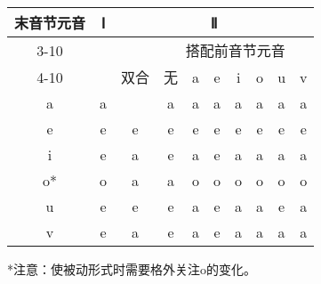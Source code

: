 \begin{center}
    \begin{tabular}{c|c|c|c|c|c|c|c|c|c}
        \toprule
        \multirow{4}{*}{末音节元音} & \multirow{4}{*}{Ⅰ} & \multicolumn{8}{c}{Ⅱ} \\
        \cline{3-10} 
        & & \multirow{3}{*}{双合} & \multicolumn{7}{c}{搭配前音节元音} \\ 
        \cline{4-10} 
        & & & 无 & a & e & i & o & u & v \\\midrule
        a & \cellcolor{cyan} a & \cellcolor{cyan} a & \cellcolor{cyan} a & \cellcolor{cyan} a & \cellcolor{cyan} a & \cellcolor{cyan} a & \cellcolor{cyan} a & \cellcolor{cyan} a & \cellcolor{cyan} a \\\hline
        e & \cellcolor{lime} e & \cellcolor{lime} e & \cellcolor{lime} e & \cellcolor{lime} e & \cellcolor{lime} e & \cellcolor{lime} e & \cellcolor{lime} e & \cellcolor{lime} e & \cellcolor{lime} e \\\hline
        i & \cellcolor{lime} e & \cellcolor{cyan} a & \cellcolor{lime} e & \cellcolor{cyan} a & \cellcolor{lime} e & \cellcolor{cyan} a & \cellcolor{cyan} a & \cellcolor{cyan} a & \cellcolor{cyan} a \\\hline
        o* & \cellcolor{pink} o & \cellcolor{cyan} a & \cellcolor{cyan} a & \cellcolor{pink} o & \cellcolor{pink} o & \cellcolor{pink} o & \cellcolor{pink} o & \cellcolor{pink} o & \cellcolor{pink} o \\\hline
        u & \cellcolor{lime} e & \cellcolor{lime} e & \cellcolor{lime} e & \cellcolor{cyan} a & \cellcolor{lime} e & \cellcolor{cyan} a & \cellcolor{cyan} a & \cellcolor{lime} e & \cellcolor{cyan} a \\\hline
        v & \cellcolor{lime} e & \cellcolor{cyan} a & \cellcolor{lime} e & \cellcolor{cyan} a & \cellcolor{lime} e & \cellcolor{cyan} a & \cellcolor{cyan} a & \cellcolor{cyan} a & \cellcolor{cyan} a \\\bottomrule
    \end{tabular}
    
    *注意：使被动形式时需要格外关注o的变化。
\end{center}

